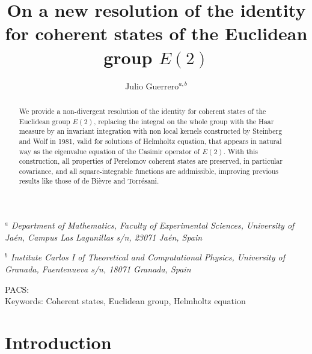 \documentclass[11pt]{article}
\begin{document}
\title{\textbf{\Large On a new resolution of the identity for coherent states of the Euclidean group $E(2)$ }}


\author{Julio Guerrero$^{a,b}$}

\maketitle
\begin{singlespace}



{\noindent \begin{center}
\emph{$^{a}$ 
Department of Mathematics, Faculty of  Experimental Sciences, University of Ja\'en, Campus Las Lagunillas s/n, 23071 Ja\'en, Spain}
\end{center}}

\vspace{-0.75cm}

{\noindent \begin{center}
\emph{$^{b}$ 
Institute Carlos I of Theoretical and Computational Physics, University of  Granada, Fuentenueva s/n, 18071 Granada, Spain}
\end{center}}


\end{singlespace}

\begin{abstract}
We provide a non-divergent resolution of the identity for coherent states of the Euclidean group $E(2)$, replacing the integral on the whole group with the Haar measure by an invariant integration
with non local kernels constructed by Steinberg and Wolf in 1981, valid for solutions of Helmholtz equation, that appears in natural way as the eigenvalue equation of the Casimir operator of $E(2)$.
With this construction, all properties of Perelomov coherent states are preserved, in particular covariance, and all square-integrable functions are addmissible, improving previous results like those of de Bi\`evre and Torr\'esani.

\end{abstract}
PACS: \\
Keywords:  Coherent states, Euclidean group, Helmholtz equation





\section{Introduction}
\label{introduction}
\end{document}
